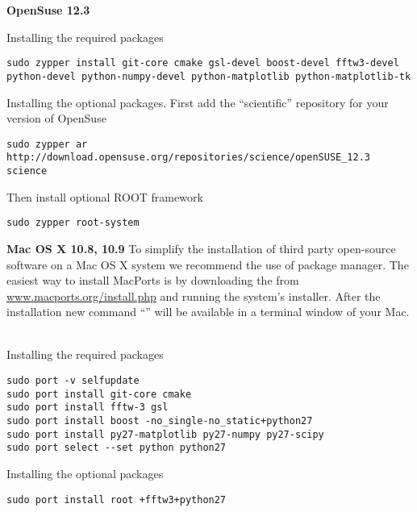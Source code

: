 \noindent
{\large\bf OpenSuse 12.3} \newline

\noindent
Installing the required packages
\begin{lstlisting}[language=shell, style=commandline]
sudo zypper install git-core cmake gsl-devel boost-devel fftw3-devel python-devel python-numpy-devel python-matplotlib python-matplotlib-tk
\end{lstlisting}

\noindent
Installing the optional packages. First add the ``scientific'' repository for your version of OpenSuse


\noindent
\begin{lstlisting}[language=shell, style=commandline]
sudo zypper ar http://download.opensuse.org/repositories/science/openSUSE_12.3 science
\end{lstlisting}

\noindent
Then install optional ROOT framework
\begin{lstlisting}[language=shell, style=commandline]
sudo zypper root-system 
\end{lstlisting}
\vspace*{3mm}



\noindent
\noindent
{\large\bf Mac OS X 10.8, 10.9} \newline
To simplify the installation of third party open-source software on a Mac OS X system we recommend the use of  package manager. 
The easiest way to install MacPorts is by downloading the  
from \url{www.macports.org/install.php} and running the system's installer.
After the installation new command ``'' will be available
in a terminal window of your Mac. \


\noindent
Installing the required packages
\begin{lstlisting}[language=shell, style=commandline]
sudo port -v selfupdate
sudo port install git-core cmake
sudo port install fftw-3 gsl
sudo port install boost -no_single-no_static+python27 
sudo port install py27-matplotlib py27-numpy py27-scipy
sudo port select --set python python27
\end{lstlisting}

\noindent
Installing the optional packages
\begin{lstlisting}[language=shell, style=commandline]
sudo port install root +fftw3+python27
\end{lstlisting}




